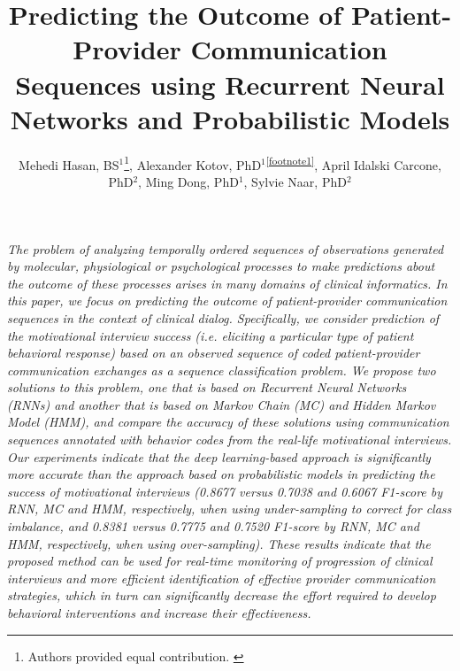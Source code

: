 \documentclass{amia_summit_2018}
\begin{document}
\title{Predicting the Outcome of Patient-Provider Communication Sequences using Recurrent Neural Networks and Probabilistic Models}

\author{Mehedi Hasan, BS$^{1}$\footnote[1]{Authors provided equal contribution. \label{footnote1}}, Alexander Kotov, PhD$^{1}$\textsuperscript{\ref{footnote1}}, April Idalski Carcone, PhD$^{2}$, Ming Dong, PhD$^{1}$, Sylvie Naar, PhD$^{2}$}


\maketitle

\textit{The problem of analyzing temporally ordered sequences of observations generated by molecular, physiological or psychological processes to make predictions about the outcome of these processes arises in many domains of clinical informatics. In this paper, we focus on predicting the outcome of patient-provider communication sequences in the context of clinical dialog. Specifically, we consider prediction of the motivational interview success (i.e. eliciting a particular type of patient behavioral response) based on an observed sequence of coded patient-provider communication exchanges as a sequence classification problem. We propose two solutions to this problem, one that is based on Recurrent Neural Networks (RNNs) and another that is based on Markov Chain (MC) and Hidden Markov Model (HMM), and compare the accuracy of these solutions using communication sequences annotated with behavior codes from the real-life motivational interviews. Our experiments indicate that the deep learning-based approach is significantly more accurate than the approach based on probabilistic models in predicting the success of motivational interviews (0.8677 versus 0.7038 and 0.6067 F1-score by RNN, MC and HMM, respectively, when using under-sampling to correct for class imbalance, and 0.8381 versus 0.7775 and 0.7520 F1-score by RNN, MC and HMM, respectively, when using over-sampling). These results indicate that the proposed method can be used for real-time monitoring of progression of clinical interviews and more efficient identification of effective provider communication strategies, which in turn can significantly decrease the effort required to develop behavioral interventions and increase their effectiveness.}
\end{document}
